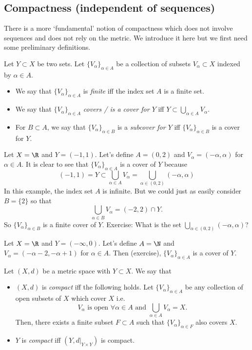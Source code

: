 \subsection{Compactness (independent of sequences)}
There is a more `fundamental' notion of compactness which does not involve sequences and does not rely on the metric. We introduce it here but we first need some preliminary definitions.
\begin{defn}[Covers]
Let $Y\subset X$ be two sets. Let $\{V_\alpha\}_{\alpha \in A}$ be a collection of subsets $V_\alpha \subset X$ indexed by $\alpha \in A$.
\begin{itemize}
	\item We say that $\{V_\alpha\}_{\alpha\in A}$ is \textit{finite} iff the index set $A$ is a finite set.
	\item We say that $\{V_\alpha\}_{\alpha \in A}$ \textit{covers / is a cover for $Y$} iff $Y \subset \bigcup_{\alpha \in A}V_\alpha.$
	\item For $B\subset A$, we say that $\{V_\alpha\}_{\alpha \in B}$ is a \textit{subcover for $Y$} iff $\{V_\alpha\}_{\alpha \in B}$ is a cover for $Y$.
\end{itemize}
\end{defn}
\begin{eg}
Let $X = \R$ and $Y = (-1,1)$. Let's define $A = (0,2)$ and $V_\alpha = (-\alpha,\alpha)$ for $\alpha \in A$. It is clear to see that $\{V_\alpha\}_{\alpha \in A}$ is a cover of $Y$ because
\[
(-1,1) = Y \subset \bigcup_{\alpha \in A} V_\alpha = \bigcup_{\alpha \in (0,2)}(-\alpha,\alpha)
\]
In this example, the index set $A$ is infinite. But we could just as easily consider $B = \{2\}$ so that
\[
\bigcup_{\alpha \in B}V_\alpha = (-2,2) \cap Y.
\]
So $\{V_\alpha\}_{\alpha \in B}$ is a finite cover of $Y$.
Exercise: What is the set $\bigcup_{\alpha \in (0,2)}(-\alpha,\alpha)$?
\end{eg}
\begin{eg}
Let $X = \R$ and $Y = (-\infty, 0)$. Let's define $A = \N$ and $V_\alpha = (-\alpha - 2, -\alpha+1)$ for $\alpha \in A$. Then (exercise), $\{V_\alpha\}_{\alpha \in A}$ is a cover of $Y$.
\end{eg}
\begin{defn}[Compact]
	\label{defn:cpct}
Let $(X,d)$ be a metric space with $Y\subset X$. We say that
\begin{itemize}
	\item $(X,d)$ is \textit{compact} iff the following holds. Let $\{V_\alpha\}_{\alpha \in A}$ be any collection of open subsets of $X$ which cover $X$ i.e.
	\[
	V_\alpha\text{ is open }\forall \alpha \in A\text{ and }\bigcup_{\alpha \in A}V_\alpha = X.
	\]
	Then, there exists a finite subset $F\subset A$ such that $\{V_\alpha\}_{\alpha \in F}$ also covers $X$.
	\item $Y$ is \textit{compact} iff $(Y,d|_{Y\times Y})$ is compact.
\end{itemize}
\end{defn}

